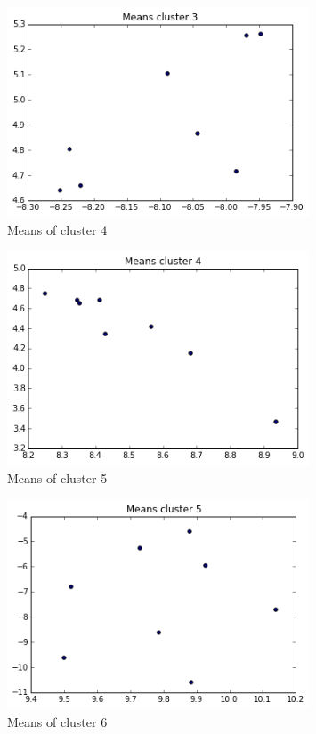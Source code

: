 \documentclass[paper=a4, fontsize=11pt]{scrartcl} %
\numberwithin{equation}{section} %
\numberwithin{figure}{section} %
\numberwithin{table}{section} %
\begin{document}
\begin{figure}[ht]
	\centering
  \includegraphics[width=0.8\textwidth]{mean_c4.png}
	\caption{Means of cluster 4}
	\label{figvn6}
\end{figure}
\begin{figure}[ht]
	\centering
  \includegraphics[width=0.8\textwidth]{mean_c5.png}
	\caption{Means of cluster 5}
	\label{figvn6}
\end{figure}
\begin{figure}[ht]
	\centering
  \includegraphics[width=0.8\textwidth]{mean_c6.png}
	\caption{Means of cluster 6}
	\label{figvn6}
\end{figure}
\end{document}
